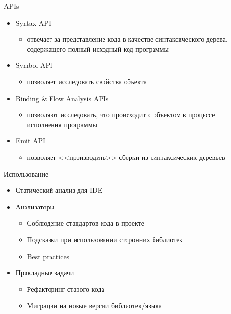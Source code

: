 \documentclass[aspectratio=169]{beamer}
\begin{document}
\begin{frame}{APIs}
    \begin{itemize}
        \item Syntax API
            \begin{itemize}
                \item отвечает за представление кода в качестве синтаксического дерева, содержащего полный исходный код программы
            \end{itemize}
        \item Symbol API
            \begin{itemize}
                \item позволяет исследовать свойства объекта
            \end{itemize}
        \item Binding \& Flow Analysis APIs
            \begin{itemize}
                \item позволяют исследовать, что происходит с объектом в процессе исполнения программы
            \end{itemize}
        \item Emit API
            \begin{itemize}
                \item позволяет <<производить>> сборки из синтаксических деревьев
            \end{itemize}
    \end{itemize}
\end{frame}

\begin{frame}{Использование}
    \begin{itemize}
        \item Статический анализ для IDE 
        \item Анализаторы 
            \begin{itemize}
                \item Соблюдение стандартов кода в проекте
                \item Подсказки при использовании сторонних библиотек
                \item Best practices
            \end{itemize}
        \item Прикладные задачи
            \begin{itemize}
                \item Рефакторинг старого кода
                \item Миграции на новые версии библиотек/языка
            \end{itemize}
    \end{itemize}
\end{frame}
\end{document}
